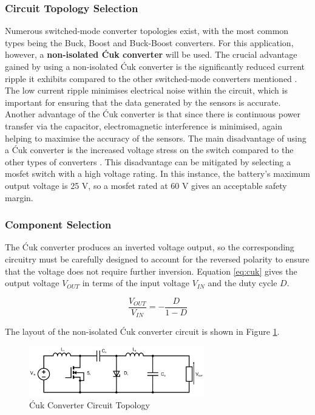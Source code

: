 \subsubsection{Circuit Topology Selection}

Numerous switched-mode converter topologies exist, with the most common types being the Buck, Boost and Buck-Boost converters. For this application, however, a \textbf{non-isolated Ćuk converter} will be used. The crucial advantage gained by using a non-isolated Ćuk converter is the significantly reduced current ripple it exhibits compared to the other switched-mode converters mentioned \cite{cuk1981dc-to-dc}. The low current ripple minimises electrical noise within the circuit, which is important for ensuring that the data generated by the sensors is accurate. Another advantage of the Ćuk converter is that since there is continuous power transfer via the capacitor, electromagnetic interference is minimised, again helping to maximise the accuracy of the sensors. The main disadvantage of using a Ćuk converter is the increased voltage stress on the switch compared to the other types of converters \cite{Bailey:1641409}. This disadvantage can be mitigated by selecting a \gls{mosfet} switch with a high voltage rating. In this instance, the battery's maximum output voltage is 25 V, so a \gls{mosfet} rated at 60 V gives an acceptable safety margin.

\subsubsection{Component Selection}

The Ćuk converter produces an inverted voltage output, so the corresponding circuitry must be carefully designed to account for the reversed polarity to ensure that the voltage does not require further inversion. Equation \ref{eq:cuk} gives the output voltage $V_{OUT}$ in terms of the input voltage $V_{IN}$ and the duty cycle $D$.

\begin{equation}
  \frac{V_{OUT}}{V_{IN}} = - \frac{D}{1-D}
  \label{eq:cuk}
\end{equation}

The layout of the non-isolated Ćuk converter circuit is shown in Figure \ref{fig:cukdiagram}.

\begin{figure}[H]
  \centering
  \includegraphics[width=0.68\textwidth]{figs/Samuel/Figures/cuk mosfet labelled (1).pdf}
  \caption{Ćuk Converter Circuit Topology}
  \label{fig:cukdiagram}
\end{figure}



